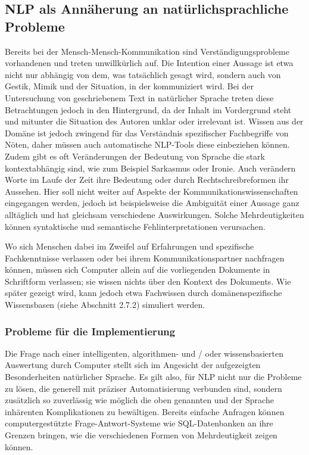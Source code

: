 \documentclass[12pt]{report}
\begin{document}
\subsection{NLP als Annäherung an natürlichsprachliche Probleme}
Bereits bei der Mensch-Mensch-Kommunikation sind  Verständigungsprobleme vorhandenen und treten unwillkürlich auf. Die Intention einer Aussage ist etwa nicht nur abhängig von dem, was tatsächlich gesagt wird, sondern auch von Gestik, Mimik und der Situation, in der kommuniziert wird. Bei der Untersuchung von geschriebenem Text in natürlicher Sprache treten diese Betrachtungen jedoch in den Hintergrund, da der Inhalt im Vordergrund steht und mitunter die Situation des Autoren unklar oder irrelevant ist. Wissen aus der Domäne ist jedoch zwingend für das Verständnis spezifischer Fachbegriffe von Nöten, daher müssen auch automatische NLP-Tools diese einbeziehen können. Zudem gibt es oft Veränderungen der Bedeutung von Sprache die stark kontextabhängig sind, wie zum Beispiel Sarkasmus oder Ironie. Auch verändern Worte im Laufe der Zeit ihre Bedeutung oder durch Rechtschreibreformen ihr Aussehen. Hier soll nicht weiter auf Aspekte der Kommunikationswissenschaften eingegangen werden, jedoch ist beispielsweise die Ambiguität einer Aussage ganz alltäglich und hat gleichsam verschiedene Auswirkungen. Solche Mehrdeutigkeiten können syntaktische und semantische Fehlinterpretationen verursachen. \cite{wei89}

Wo sich Menschen dabei im Zweifel auf Erfahrungen und spezifische Fachkenntnisse verlassen oder bei ihrem Kommunikationspartner nachfragen können, müssen sich Computer allein auf die vorliegenden Dokumente in Schriftform verlassen; sie wissen nichts über den Kontext des Dokuments. Wie später gezeigt wird, kann jedoch etwa Fachwissen durch domänenspezifische Wissensbasen (siehe Abschnitt 2.7.2) simuliert werden. 
\subsubsection{Probleme für die Implementierung}

Die Frage nach einer intelligenten, algorithmen- und / oder wissensbasierten Auswertung durch Computer stellt sich im Angesicht der aufgezeigten Besonderheiten natürlicher Sprache. Es gilt also, für NLP nicht nur die Probleme zu lösen, die generell mit präziser Automatisierung verbunden sind, sondern zusätzlich so zuverlässig wie möglich die oben genannten und der Sprache inhärenten Komplikationen zu bewältigen. 
Bereits einfache Anfragen können computergestützte Frage-Antwort-Systeme wie SQL-Datenbanken an ihre Grenzen bringen, wie die verschiedenen Formen von Mehrdeutigkeit zeigen können.
\end{document}

